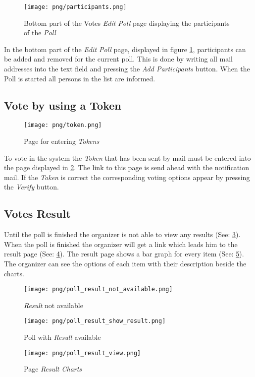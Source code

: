 \begin{figure}
\centering
\texttt{[image: png/participants.png]}
\caption{Bottom part of the Votes \textit{Edit Poll} page displaying the participants of the \textit{Poll}}
\label{F:participants}
\end{figure}

In the bottom part of the \textit{Edit Poll} page, displayed in figure \ref*{F:participants}, participants can be added and removed for the current poll. This is done by writing all mail addresses into the text field and pressing the \textit{Add Participants} button. When the Poll is started all persons in the list are informed.

\subsection{Vote by using a Token}

\begin{figure}
\centering
\texttt{[image: png/token.png]}
\caption{Page for entering \textit{Tokens}}
\label{F:token}
\end{figure}

To vote in the system the \textit{Token} that has been sent by mail must be entered into the page displayed in \ref{F:token}. The link to this page is send ahead with the notification mail. If the \textit{Token} is correct the corresponding voting options appear by pressing the \textit{Verify} button.

\subsection{Votes Result}

Until the poll is finished the organizer is not able to view any results (See: \ref{F:not_available}).
When the poll is finished the organizer will get a link which leads him to the result page (See: \ref{F:show_result}).
The result page shows a bar graph for every item (See: \ref{F:result_charts}). The organizer can see the options of each item with their description beside the charts.

\begin{figure}
\centering
\texttt{[image: png/poll\_result\_not\_available.png]}
\caption{\textit{Result} not available }
\label{F:not_available}
\end{figure}


\begin{figure}
\centering
\texttt{[image: png/poll\_result\_show\_result.png]}
\caption{Poll with \textit{Result} available}
\label{F:show_result}
\end{figure}


\begin{figure}
\centering
\texttt{[image: png/poll\_result\_view.png]}
\caption{Page \textit{Result Charts}}
\label{F:result_charts}
\end{figure}









